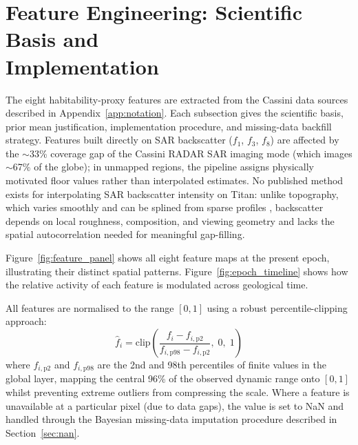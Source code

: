 \chapter{Feature Engineering: Scientific Basis and \\ Implementation}
\label{app:features}

The eight habitability-proxy features are extracted from the Cassini data
sources described in Appendix~\ref{app:notation}.  Each subsection gives the
scientific basis, prior mean justification, implementation procedure, and
missing-data backfill strategy.  Features built directly on SAR backscatter ($f_1$, $f_3$, $f_8$) are affected by the $\sim$33\% coverage gap of the Cassini RADAR SAR imaging mode (which images $\sim$67\% of the globe); in unmapped regions, the pipeline assigns physically motivated floor values rather than interpolated estimates.  No published method exists for interpolating SAR backscatter intensity on Titan: unlike topography, which varies smoothly and can be splined from sparse profiles \citep{Lorenz2013,Corlies2017Titan}, backscatter depends on local roughness, composition, and viewing geometry and lacks the spatial autocorrelation needed for meaningful gap-filling.

Figure~\ref{fig:feature_panel} shows all eight feature maps at the present
epoch, illustrating their distinct spatial patterns.  Figure~\ref{fig:epoch_timeline}
shows how the relative activity of each feature is modulated across geological
time.

All features are normalised to the range $[0, 1]$ using a robust
percentile-clipping approach:
\begin{equation}
  \hat{f}_i = \mathrm{clip}\!\left(
    \frac{f_i - f_{i,\text{p2}}}{f_{i,\text{p98}} - f_{i,\text{p2}}},
    \; 0, \; 1
  \right)
  \label{eq:normalise_app}
\end{equation}
where $f_{i,\text{p2}}$ and $f_{i,\text{p98}}$ are the 2nd and 98th
percentiles of finite values in the global layer, mapping the central 96\%
of the observed dynamic range onto $[0, 1]$ whilst preventing extreme outliers
from compressing the scale.  Where a feature is unavailable at a particular
pixel (due to data gaps), the value is set to NaN and handled through the
Bayesian missing-data imputation procedure described in Section~\ref{sec:nan}.


